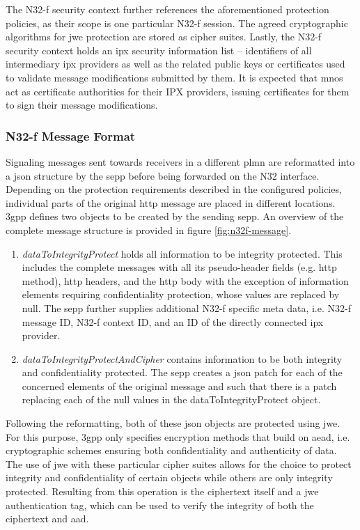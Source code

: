 The N32-f security context further references the aforementioned protection policies, as their scope is one particular N32-f session.
The agreed cryptographic algorithms for \gls{jwe} protection are stored as cipher suites.
Lastly, the N32-f security context holds an \gls{ipx} security information list -- identifiers of all intermediary \gls{ipx} providers as well as the related  public keys or certificates used to validate message modifications submitted by them.
It is expected that \glspl{mno} act as certificate authorities for their IPX providers, issuing certificates for them to sign their message modifications.

\subsubsection{N32-f Message Format}

Signaling messages sent towards receivers in a different \gls{plmn} are reformatted into a \gls{json} structure by the \gls{sepp} before being forwarded on the N32 interface.
Depending on the protection requirements described in the configured policies, individual parts of the original \gls{http} message are placed in different locations.
\gls{3gpp} defines two objects to be created by the sending \gls{sepp}.
An overview of the complete message structure is provided in figure \ref{fig:n32f-message}.

\begin{enumerate}[label=--]
    \item \textit{dataToIntegrityProtect} holds all information to be integrity protected.
    This includes the complete messages with all its pseudo-header fields (e.g. \gls{http} method), \gls{http} headers, and the \gls{http} body with the exception of information elements requiring confidentiality protection, whose values are replaced by null.
    The \gls{sepp} further supplies additional N32-f specific meta data, i.e. N32-f message ID, N32-f context ID, and an ID of the directly connected \gls{ipx} provider.

    \item \textit{dataToIntegrityProtectAndCipher} contains information to be both integrity and confidentiality protected.
    The \gls{sepp} creates a \gls{json} patch for each of the concerned elements of the original message and such that there is a patch replacing each of the null values in the dataToIntegrityProtect object.
\end{enumerate}

Following the reformatting, both of these \gls{json} objects are protected using \gls{jwe}.
For this purpose, \gls{3gpp} only specifies encryption methods that build on \gls{aead}, i.e. cryptographic schemes ensuring both confidentiality and authenticity of data.
The use of \gls{jwe} with these particular cipher suites allows for the choice to protect integrity and confidentiality of certain objects while others are only integrity protected.
Resulting from this operation is the ciphertext itself and a \gls{jwe} authentication tag, which can be used to verify the integrity of both the ciphertext and \gls{aad}.

